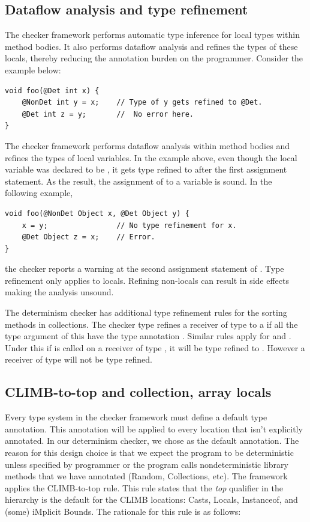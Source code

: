\subsection{Dataflow analysis and type refinement}\label{dataflow}
The checker framework performs automatic type inference for local types within method bodies.
It also performs dataflow analysis and refines the types of these locals, thereby reducing the annotation burden 
on the programmer. Consider the example below:
\begin{verbatim}
void foo(@Det int x) {
    @NonDet int y = x;    // Type of y gets refined to @Det.
    @Det int z = y;       //  No error here.
}
\end{verbatim}
The checker framework performs dataflow analysis within method bodies and refines the types of local variables.
In the example above, even though the local variable  was declared to be , it gets
type refined to  after the first assignment statement. As the result, the assignment of 
to a  variable  is sound. In the following example,
\begin{verbatim}
void foo(@NonDet Object x, @Det Object y) {
    x = y;                // No type refinement for x.
    @Det Object z = x;    // Error.
}
\end{verbatim}
the checker reports a warning at the second assignment statement of . Type refinement only applies to locals. Refining non-locals can result in side effects making the analysis unsound.

The determinism checker has additional type refinement rules for the sorting methods in collections. 
The checker type refines a receiver of type  to a  if all the
type argument of this  have the type annotation . Similar rules apply for  and
.
Under this if  is called on a receiver of type , it will
be type refined to . However a receiver of type  will not be type refined.

\subsection{CLIMB-to-top and collection, array locals}\label{climb-rules}

Every type system in the checker framework must define a default type annotation. This annotation will be applied
to every location that isn't explicitly annotated. In our determinism checker, we chose  as the default annotation.
The reason for this design choice is that we expect the program to be 
deterministic unless specified by programmer or the program calls nondeterministic library methods that we have annotated 
(Random, Collections, etc).
The framework applies the CLIMB-to-top rule. This rule states that the \textit{top} qualifier 
in the hierarchy is the default for the CLIMB locations: Casts, Locals, Instanceof, and (some) iMplicit Bounds. The rationale
for this rule is as follows:

